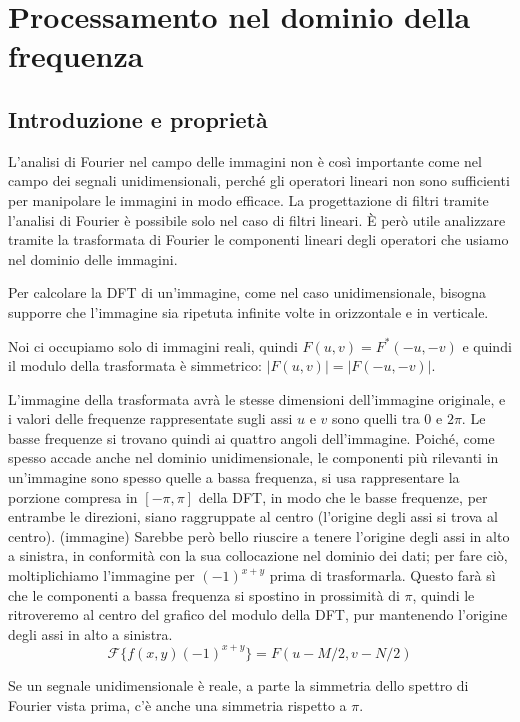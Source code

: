 \documentclass[a4paper,11pt]{article}
\begin{document}
\newpage

\section{Processamento nel dominio della frequenza}

\subsection{Introduzione e proprietà}
L'analisi di Fourier nel campo delle immagini non è così importante come nel campo dei segnali unidimensionali, perché gli operatori lineari
non sono sufficienti per manipolare le immagini in modo efficace. La progettazione di filtri tramite l'analisi di Fourier è possibile solo nel caso
di filtri lineari. È però utile analizzare tramite la trasformata di Fourier le componenti lineari degli operatori che usiamo nel dominio delle immagini.
\par
Per calcolare la DFT di un'immagine, come nel caso unidimensionale, bisogna supporre che l'immagine sia ripetuta infinite volte in orizzontale e in verticale.
\par
Noi ci occupiamo solo di immagini reali, quindi $F(u,v) = F^*(-u,-v)$ e quindi il modulo della trasformata è simmetrico: $|F(u,v)|=|F(-u,-v)|$.
\par
L'immagine della trasformata avrà le stesse dimensioni dell'immagine originale, e i valori delle frequenze rappresentate sugli assi $u$ e $v$ sono quelli
tra 0 e $2\pi$. Le basse frequenze si trovano quindi ai quattro angoli dell'immagine. Poiché, come spesso accade anche nel dominio unidimensionale,
le componenti più rilevanti in un'immagine sono spesso quelle a bassa frequenza, si usa rappresentare la porzione compresa
in $[-\pi,\pi]$ della DFT, in modo che le basse frequenze, per entrambe le direzioni, siano raggruppate al centro
(l'origine degli assi si trova al centro). (immagine)
Sarebbe però bello riuscire a tenere l'origine degli assi in alto a sinistra, in conformità con la sua collocazione nel dominio dei dati;
per fare ciò, moltiplichiamo l'immagine per $(-1)^{x+y}$ prima di trasformarla. Questo farà sì che le componenti a bassa frequenza si spostino in prossimità di $\pi$, quindi le ritroveremo al centro del grafico
del modulo della DFT, pur mantenendo l'origine degli assi in alto a sinistra.
\[
\mathcal{F}\{f(x,y)(-1)^{x+y}\} = F(u - M/2, v - N/2)
\]
\par
Se un segnale unidimensionale è reale, a parte la simmetria dello spettro di Fourier vista prima, c'è anche una simmetria rispetto a $\pi$.
\end{document}
